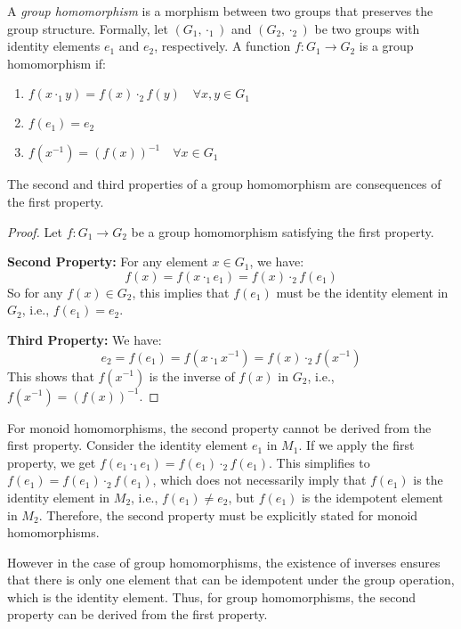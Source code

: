 \documentclass[
	11pt, %
	fleqn, %
	a4paper, %
]{LegrandOrangeBook}
\begin{document}
\begin{definition}
    A \emph{group homomorphism} is a morphism between two groups that preserves the group structure. Formally, let $(G_1, \cdot_1)$ and $(G_2, \cdot_2)$ be two groups with identity elements $e_1$ and $e_2$, respectively. A function $f: G_1 \to G_2$ is a group homomorphism if:
    \begin{enumerate}
        \item $f(x \cdot_1 y) = f(x) \cdot_2 f(y) \quad \forall x, y \in G_1$
        \item $f(e_1) = e_2$
        \item $f(x^{-1}) = (f(x))^{-1} \quad \forall x \in G_1$
    \end{enumerate}
\end{definition}

\begin{proposition}
    The second and third properties of a group homomorphism are consequences of the first property.
\end{proposition}

\begin{proof}
    Let $f: G_1 \to G_2$ be a group homomorphism satisfying the first property.

    \textbf{Second Property:} For any element $x \in G_1$, we have:
    \[
        f(x) = f(x \cdot_1 e_1) = f(x) \cdot_2 f(e_1)
    \]
    So for any $f(x) \in G_2$, this implies that $f(e_1)$ must be the identity element in $G_2$, i.e., $f(e_1) = e_2$.

    \textbf{Third Property:} We have:
    \[
        e_2 = f(e_1) = f(x \cdot_1 x^{-1}) = f(x) \cdot_2 f(x^{-1})
    \]
    This shows that $f(x^{-1})$ is the inverse of $f(x)$ in $G_2$, i.e., $f(x^{-1}) = (f(x))^{-1}$.
\end{proof}

For monoid homomorphisms, the second property cannot be derived from the first property. Consider the identity element $e_1$ in $M_1$. If we apply the first property, we get $f(e_1 \cdot_1 e_1) = f(e_1) \cdot_2 f(e_1)$. This simplifies to $f(e_1) = f(e_1) \cdot_2 f(e_1)$, which does not necessarily imply that $f(e_1)$ is the identity element in $M_2$, i.e., $f(e_1) \neq e_2$, but $f(e_1)$ is the idempotent element in $M_2$. Therefore, the second property must be explicitly stated for monoid homomorphisms.

However in the case of group homomorphisms, the existence of inverses ensures that there is only one element that can be idempotent under the group operation, which is the identity element. Thus, for group homomorphisms, the second property can be derived from the first property.
\end{document}
